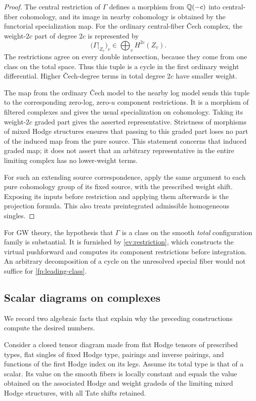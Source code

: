 \begin{proof}
The central restriction of $\Gamma$ defines a morphism from $\mathbb Q(-c)$ into
central-fiber cohomology, and its image in nearby cohomology is obtained by
the functorial specialization map.  For the ordinary central-fiber
\v{C}ech complex, the weight-$2c$ part of degree $2c$ is represented by
\[
 \bigl(\Gamma|_{Z_v}\bigr)_v\in\bigoplus_v H^{2c}(Z_v).
\]
The restrictions agree on every double intersection, because they come from
one class on the total space.  Thus this tuple is a cycle in the first
ordinary weight differential.  Higher \v{C}ech-degree terms in total degree
$2c$ have smaller weight.

The map from the ordinary \v{C}ech model to the nearby log model sends this
tuple to the corresponding zero-log, zero-$u$ component restrictions.  It is
a morphism of filtered complexes and gives the usual specialization on
cohomology.  Taking its weight-$2c$ graded part gives the asserted
representative.  Strictness of morphisms of mixed Hodge structures ensures
that passing to this graded part loses no part of the induced map from the
pure source.  This statement concerns that induced graded map; it does not
assert that an arbitrary representative in the entire limiting complex has
no lower-weight terms.

For such an extending source correspondence, apply the same argument to
each pure cohomology group of its fixed source, with the prescribed weight
shift.  Exposing its inputs before restriction and applying them afterwards
is the projection formula.  This also treats preintegrated admissible
homogeneous singles.
\end{proof}

For GW theory, the hypothesis that $\Gamma$ is a class on the smooth
\emph{total} configuration family is substantial.  It is furnished by
\cref{ev:restriction}, which constructs the virtual pushforward and computes
its component restrictions before integration.  An arbitrary decomposition
of a cycle on the unresolved special fiber would not suffice for
\cref{fp:leading-class}.

\subsection{Scalar diagrams on complexes}

We record two algebraic facts that explain why the preceding constructions
compute the desired numbers.

\begin{lemma}\label{fp:scalar-limit}
Consider a closed tensor diagram made from flat Hodge tensors of prescribed
types, flat singles of fixed Hodge type, pairings and inverse pairings, and functions
of the first Hodge index on its legs.  Assume its total type is that of a
scalar.  Its value on the smooth fibers is locally constant and equals the
value obtained on the associated Hodge and weight gradeds of the limiting
mixed Hodge structures, with all Tate shifts retained.
\end{lemma}


